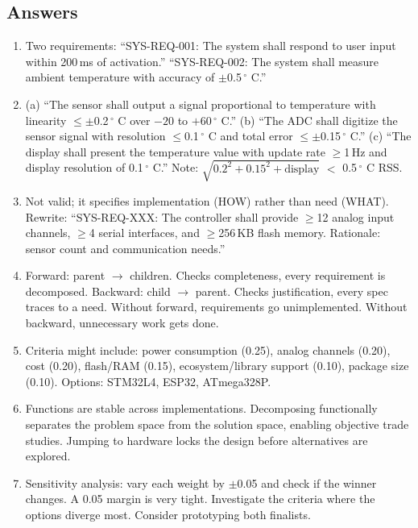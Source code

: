\subsection{Answers}
\begin{enumerate}[leftmargin=1.5em]
\item Two requirements: ``SYS-REQ-001: The system shall respond to user input within 200\,ms of activation.'' ``SYS-REQ-002: The system shall measure ambient temperature with accuracy of $\pm$0.5\,$^{\circ}$ C.''
\item (a) ``The sensor shall output a signal proportional to temperature with linearity $\leq \pm$0.2\,$^{\circ}$ C over $-20$ to $+60$\,$^{\circ}$ C.'' (b) ``The ADC shall digitize the sensor signal with resolution $\leq$0.1\,$^{\circ}$ C and total error $\leq \pm$0.15\,$^{\circ}$ C.'' (c) ``The display shall present the temperature value with update rate $\geq$1\,Hz and display resolution of 0.1\,$^{\circ}$ C.'' Note: $\sqrt{0.2^2+0.15^2+\text{display}}$ $<$ 0.5\,$^{\circ}$ C RSS.
\item Not valid; it specifies implementation (HOW) rather than need (WHAT). Rewrite: ``SYS-REQ-XXX: The controller shall provide $\geq$12 analog input channels, $\geq$4 serial interfaces, and $\geq$256\,KB flash memory. Rationale: sensor count and communication needs.''
\item Forward: parent $\to$ children. Checks completeness, every requirement is decomposed. Backward: child $\to$ parent. Checks justification, every spec traces to a need. Without forward, requirements go unimplemented. Without backward, unnecessary work gets done.
\item Criteria might include: power consumption (0.25), analog channels (0.20), cost (0.20), flash/RAM (0.15), ecosystem/library support (0.10), package size (0.10). Options: STM32L4, ESP32, ATmega328P.
\item Functions are stable across implementations. Decomposing functionally separates the problem space from the solution space, enabling objective trade studies. Jumping to hardware locks the design before alternatives are explored.
\item Sensitivity analysis: vary each weight by $\pm$0.05 and check if the winner changes. A 0.05 margin is very tight. Investigate the criteria where the options diverge most. Consider prototyping both finalists.
\end{enumerate}

